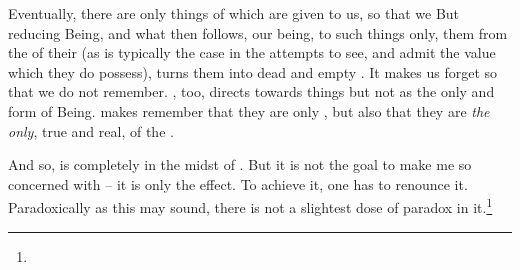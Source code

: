 \pa
Eventually, there are only  things of 
which are given to us, so that we  But reducing Being, and what then follows, our
being, to such things only,  them from the
 of their  (as is typically the case in
the attempts to see,  and admit the value which they do
possess), turns them into
dead and empty . It makes us forget so that we do not remember.
, too, directs  towards  things but not
as the only and  form of Being.  makes
 remember that they are only , but also that they are
{\em the only}, true and real,  of the . 



\pa\label{pa:hardwork}
And so,  is completely  in the
midst of . 
But it is not the goal to make me so concerned with  -- it is
only the effect. To achieve it, one has to renounce it. Paradoxically as this
may sound, there is not a slightest dose of paradox in
it.\footnote{}

